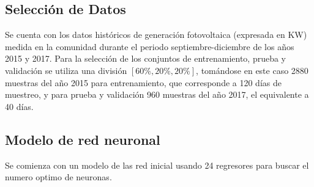 \documentclass[12pt]{article}
\begin{document}
\subsection{Selección de Datos}
Se cuenta con los datos históricos de generación fotovoltaica (expresada en KW) medida en la comunidad durante el periodo septiembre-diciembre de los años 2015 y 2017. Para la selección de los conjuntos de entrenamiento, prueba y validación se utiliza una división $[60\%,20\%,20\%]$, tomándose en este caso 2880 muestras del año 2015 para entrenamiento, que corresponde a 120 días de muestreo, y para prueba y validación 960 muestras del año 2017, el equivalente a 40 días.
				


\subsection{Modelo de red neuronal}
Se comienza con un modelo de las red inicial usando 24 regresores para buscar el numero optimo de neuronas.

\newpage


\end{document}
